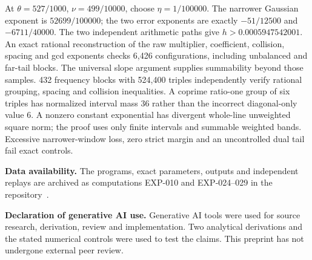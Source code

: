 \documentclass[11pt]{article}
\theoremstyle{remark}
\begin{document}
At $\theta=527/1000$, $\nu=499/10000$, choose $\eta=1/100000$.
The narrower Gaussian exponent is $52699/100000$; the two error exponents
are exactly $-51/12500$ and $-6711/40000$. The two independent arithmetic
paths give $h>0.0005947542001$. An exact rational reconstruction of the
raw multiplier, coefficient, collision, spacing and gcd exponents checks
6,426 configurations, including unbalanced and far-tail blocks. The
universal slope argument supplies summability beyond those samples.
432 frequency blocks with 524,400 triples independently verify rational
grouping, spacing and collision inequalities. A coprime ratio-one group
of six triples has normalized interval mass $36$ rather than the
incorrect diagonal-only value $6$. A nonzero constant exponential has
divergent whole-line unweighted square norm; the proof uses only finite
intervals and summable weighted bands. Excessive narrower-window loss,
zero strict margin and an uncontrolled dual tail fail exact controls.

\medskip
\noindent\textbf{Data availability.} The programs, exact parameters, outputs
and independent replays are archived as computations EXP-010 and EXP-024--029 in the
repository~\cite{Record,Record28,Record29}.

\medskip
\noindent\textbf{Declaration of generative AI use.} Generative AI tools were
used for source research, derivation, review and implementation. Two analytical derivations and the stated numerical controls
were used to test the claims. This preprint has not undergone external peer review.
\end{document}
